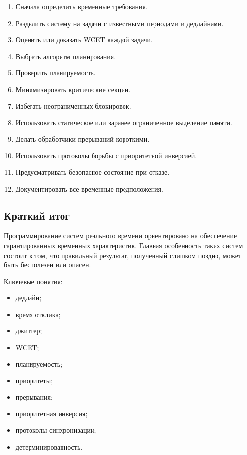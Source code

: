 \documentclass[12pt,a4paper]{article}
\begin{document}
\begin{enumerate}
    \item Сначала определить временные требования.
    \item Разделить систему на задачи с известными периодами и дедлайнами.
    \item Оценить или доказать WCET каждой задачи.
    \item Выбрать алгоритм планирования.
    \item Проверить планируемость.
    \item Минимизировать критические секции.
    \item Избегать неограниченных блокировок.
    \item Использовать статическое или заранее ограниченное выделение памяти.
    \item Делать обработчики прерываний короткими.
    \item Использовать протоколы борьбы с приоритетной инверсией.
    \item Предусматривать безопасное состояние при отказе.
    \item Документировать все временные предположения.
\end{enumerate}

\subsection{Краткий итог}

Программирование систем реального времени ориентировано на обеспечение гарантированных временных характеристик. Главная особенность таких систем состоит в том, что правильный результат, полученный слишком поздно, может быть бесполезен или опасен.

Ключевые понятия:
\begin{itemize}
    \item дедлайн;
    \item время отклика;
    \item джиттер;
    \item WCET;
    \item планируемость;
    \item приоритеты;
    \item прерывания;
    \item приоритетная инверсия;
    \item протоколы синхронизации;
    \item детерминированность.
\end{itemize}
\end{document}
